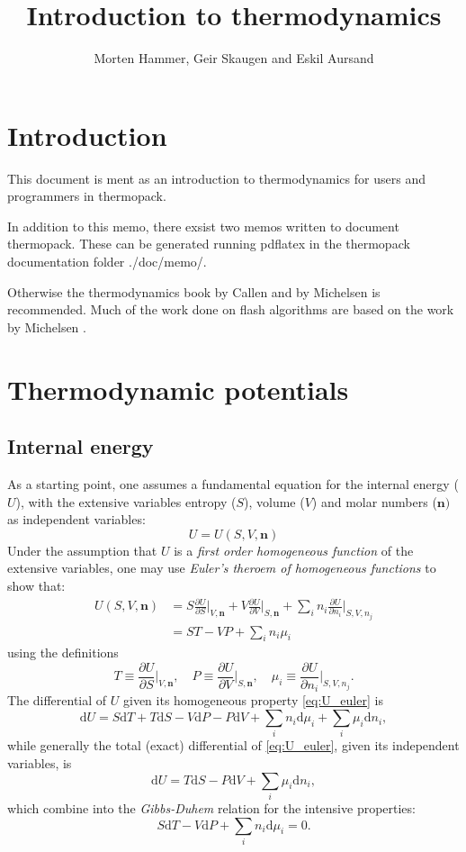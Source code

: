 \documentclass[english]{../thermomemo/thermomemo}
\title{Introduction to thermodynamics}
\author{Morten Hammer, Geir Skaugen and Eskil Aursand}
\newcommand{\pone}[3]{\frac{\partial #1}{\partial #2}\bigg|_{#3}}%
\newcommand*{\vektor}[1]{\boldsymbol{#1}}%
\newcommand{\dd}[1]{\mathrm{d}{#1}}
\begin{document}
\frontmatter

\tableofcontents

\section{Introduction}
This document is ment as an introduction to thermodynamics for users
and programmers in thermopack.

In addition to this memo, there exsist two memos written to document
thermopack. These can be generated running pdflatex in the thermopack
documentation folder ./doc/memo/.

Otherwise the thermodynamics book by Callen \cite{callen85} and by
Michelsen \cite{michelsen07} is recommended. Much of the work done on
flash algorithms are based on the work by Michelsen
\cite{michelsen82a,michelsen82b,michelsen99}.

\section{Thermodynamic potentials}
\subsection{Internal energy}
As a starting point, one assumes a fundamental equation for the internal energy ($U$), with the extensive variables entropy ($S$), volume ($V$) 
and molar numbers ($\vektor{n})$ as independent variables:
\begin{equation}
  U = U(S,V,\vektor{n})
  \label{}
\end{equation}
Under the assumption that $U$ is a \textit{first order homogeneous function} of the extensive variables, one may use 
\textit{Euler's theroem of homogeneous functions} to show that:
\begin{align}
  U(S,V,\vektor{n}) &= S \pone{U}{S}{V,\vektor{n}}
  +V \pone{U}{V}{S,\vektor{n}}
  +\sum_i n_i \pone{U}{n_i}{S,V,n_j} \nonumber \\
  &= ST - VP + \sum_i n_i \mu_i
  \label{eq:U_euler}
\end{align}
using the definitions 
\begin{equation}
  T \equiv \pone{U}{S}{V,\vektor{n}}, \quad P \equiv \pone{U}{V}{S,\vektor{n}}, \quad \mu_i \equiv \pone{U}{n_i}{S,V,n_j}.
  \label{}
\end{equation}
The differential of $U$ given its homogeneous property \eqref{eq:U_euler} is 
\begin{equation}
  \dd{U} = S\dd{T} + T\dd{S} - V\dd{P} - P\dd{V} + \sum_i n_i \dd{\mu_i} + \sum_i \mu_i \dd{n_i},
  \label{}
\end{equation}
while generally the total (exact) differential of \eqref{eq:U_euler}, given its independent variables, is
\begin{equation}
  \dd{U} = T\dd{S} - P\dd{V} + \sum_i \mu_i \dd{n_i},
  \label{eq:U_totaldiff}
\end{equation}
which combine into the \textit{Gibbs-Duhem} relation for the intensive properties:
\begin{equation}
  S\dd{T} - V\dd{P} + \sum_i n_i \dd{\mu_i} = 0.
  \label{eq:gibbsduhem}
\end{equation}
\end{document}
